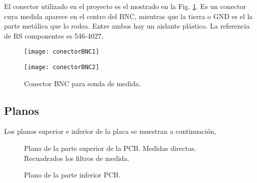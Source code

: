 \documentclass{report}
\begin{document}
El conector utilizado en el proyecto es el mostrado en la Fig. \ref{fig.conectorBNC}. Es un conector cuya medida aparece en el centro del BNC, mientras que la tierra o GND es el la parte metálica que lo rodea. Entre ambos hay un aislante plástico. La referencia de RS componentes es 546-4027.

\begin{figure}
    \begin{minipage}[b]{.5\linewidth}
    \centering \texttt{[image: conectorBNC1]}
    \label{fig.conectorBNC1}
    \end{minipage}%
    \begin{minipage}[b]{.5\linewidth}
    \centering \texttt{[image: conectorBNC2]}
    \label{fig.conectorBNC2}
    \end{minipage}
    \caption{Conector BNC para sonda de medida.} \label{fig.conectorBNC}
\end{figure}

\clearpage
\subsection*{Planos}
Los planos superior e inferior de la placa se muestran a continuación,

    
\begin{figure}[!h]
    \begin{center}
        \end{center}
        \caption{Plano de la parte superior de la PCB. Medidas directas.  Recuadrados los filtros de medida.}
        \label{fig.PCB_SUPERIOR}
\end{figure}

\begin{figure}[!h]
    \begin{center}
        \end{center}
        \caption{Plano de la parte inferior PCB.}
        \label{fig.PCB_INDERIOR}
\end{figure}
\end{document}
